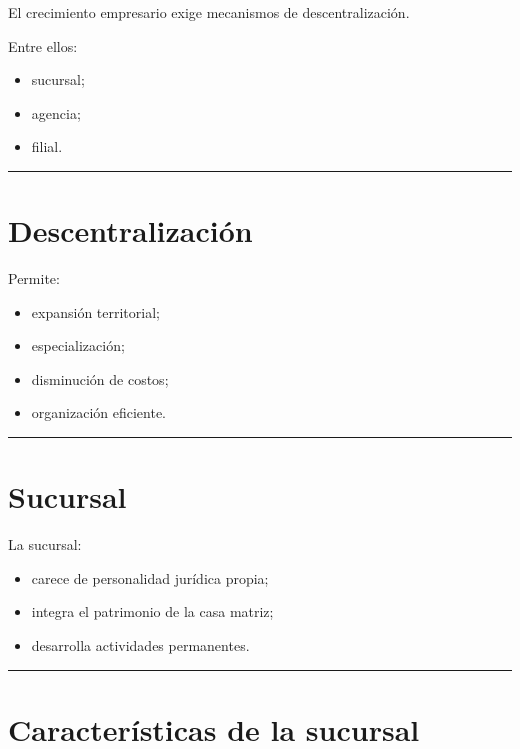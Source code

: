 \documentclass[
  spanish,
  letterpaper,
  DIV=11,
  numbers=noendperiod]{scrartcl}
\providecommand{\tightlist}{%
  \setlength{\itemsep}{0pt}\setlength{\parskip}{0pt}}
\begin{document}
El crecimiento empresario exige mecanismos de descentralización.

Entre ellos:

\begin{itemize}
\tightlist
\item
  sucursal;
\item
  agencia;
\item
  filial.
\end{itemize}

\begin{center}\rule{0.5\linewidth}{0.5pt}\end{center}

\section{Descentralización}\label{descentralizaciuxf3n}

Permite:

\begin{itemize}
\tightlist
\item
  expansión territorial;
\item
  especialización;
\item
  disminución de costos;
\item
  organización eficiente.
\end{itemize}

\begin{center}\rule{0.5\linewidth}{0.5pt}\end{center}

\section{Sucursal}\label{sucursal}

La sucursal:

\begin{itemize}
\tightlist
\item
  carece de personalidad jurídica propia;
\item
  integra el patrimonio de la casa matriz;
\item
  desarrolla actividades permanentes.
\end{itemize}

\begin{center}\rule{0.5\linewidth}{0.5pt}\end{center}

\section{Características de la
sucursal}\label{caracteruxedsticas-de-la-sucursal}
\end{document}
